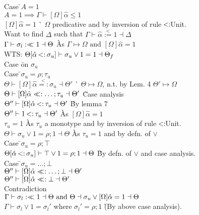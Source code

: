 \documentclass {article}
\newcommand{\st}{\ensuremath{\hspace{-1px}<:\hspace{-1px}}}
\newcommand{\alphahat}{\hat{\alpha}}
\newcommand{\lub}{\ensuremath{\vee}}
\newcommand{\instr}{\overset{<}{=:}}
\newcommand{\instl}{\overset{<}{:=}}
\newcommand{\sigbndl}{:<\hspace{-5px}<}
\newcommand{\sigbndr}{<\hspace{-5px}<:}
\renewcommand{\and}{\text{ and }}
\newcommand{\ctxmapto}{\longmapsto}
\begin{document}
\begin{tabbing}
Case \=$A = 1$\\
\>$A = 1 \implies \Gamma \vdash [\Omega]\alphahat \leq 1$\\
\>$[\Omega]\alphahat = 1$ \` $\Omega$ predicative and by inversion of rule $\st$Unit.\\
\>Want to find $\Delta$ such that $\Gamma \vdash \alphahat \instl 1 \dashv \Delta$\\
\>$\Gamma \vdash \sigma_l \sigbndl 1 \dashv \Theta$ \` As $\Gamma \ctxmapto \Omega\and [\Omega]\alphahat = 1$\\
\> WTS: $\Theta[\alphahat\st\sigma_u] \vdash \sigma_u \lub 1 = 1 \dashv \Theta_f$\\
\>Case \=on $\sigma_u$\\
\>\>Case \=$\sigma_u = \rho;\tau_u$\\
\>\>\>$\Theta\vdash [\Omega]\alphahat \instr \sigma_u \dashv\Theta'$ \` $\Theta \ctxmapto \Omega$, n.t. by Lem. 4 $\Theta'\ctxmapto\Omega$\\
\>\>\>$\Theta\vdash [\Omega]\alphahat \sigbndr \ldots;\tau_u \dashv \Theta'$ \` Case analysis\\
\>\>\>$\Theta''\vdash[\Omega]\alphahat\st\tau_u \dashv\Theta'$ \` By lemma 7\\
\>\>\>$\Theta''\vdash1 \st \tau_u \dashv\Theta'$ \` As $[\Omega]\alphahat = 1$\\
\>\>\>$\tau_u = 1$ \` As $\tau_u$ a monotype and by inversion of rule  $\st$Unit.\\
\>\>\>$\Theta \vdash \sigma_u \lub 1 = \rho;1\dashv\Theta$ \` As $\tau_u = 1$ and by defn. of $\lub$\\
\>\>Case \=$\sigma_u = \rho;\top$\\
\>\>\>$\Theta[\alphahat \st \sigma_u] \vdash \top \lub 1 = \rho;1 \dashv \Theta$ \` By defn. of $\lub$ and case analysis.\\
\>\>Case \=$\sigma_u = \ldots;\bot$\\
\>\>\>$\Theta'' \vdash [\Omega]\alphahat \sigbndr \ldots;\bot \dashv\Theta'$\\
\>\>\>$\Theta''\vdash [\Omega]\alphahat \sigbndr \bot \dashv \Theta'$\\
\>\>\>Contradiction\\
\> $\Gamma \vdash \sigma_l \sigbndl 1 \dashv \Theta \and \Theta \dashv \sigma_u \lub [\Omega]\alphahat = 1 \dashv\Theta$\\
\> $\Gamma \vdash \sigma_l \vee 1 = \sigma_l'$ where $\sigma_l' = \rho;1$ \` (By above case analysis).\\

\end{tabbing}
\end{document}
